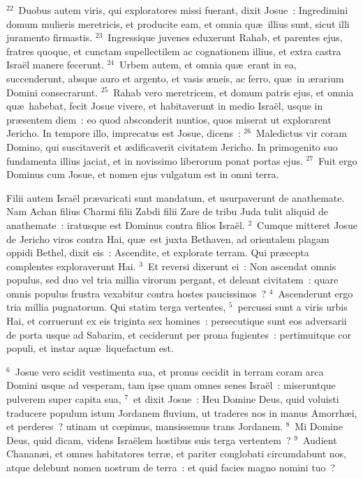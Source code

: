 ${}^{22}$~Duobus autem viris, qui exploratores missi fuerant, dixit Josue~: Ingredimini domum mulieris meretricis, et producite eam, et omnia qu\ae\ illius sunt, sicut illi juramento firmastis.
${}^{23}$~Ingressique juvenes eduxerunt Rahab, et parentes ejus, fratres quoque, et cunctam supellectilem ac cognationem illius, et extra castra Isra\"el manere fecerunt.
${}^{24}$~Urbem autem, et omnia qu\ae\ erant in ea, succenderunt, absque auro et argento, et vasis \ae neis, ac ferro, qu\ae\ in \ae rarium Domini consecrarunt.
${}^{25}$~Rahab vero meretricem, et domum patris ejus, et omnia qu\ae\ habebat, fecit Josue vivere, et habitaverunt in medio Isra\"el, usque in pr\ae sentem diem~: eo quod absconderit nuntios, quos miserat ut explorarent Jericho. In tempore illo, imprecatus est Josue, dicens~:
${}^{26}$~Maledictus vir coram Domino, qui suscitaverit et \ae dificaverit civitatem Jericho. In primogenito suo fundamenta illius jaciat, et in novissimo liberorum ponat portas ejus.
${}^{27}$~Fuit ergo Dominus cum Josue, et nomen ejus vulgatum est in omni terra.

\lettrine[lines=3,image=true,loversize=0.05,lraise=-0.03]{F}{}ilii autem Isra\"el pr\ae varicati sunt mandatum, et usurpaverunt de anathemate. Nam Achan filius Charmi filii Zabdi filii Zare de tribu Juda tulit aliquid de anathemate~: iratusque est Dominus contra filios Isra\"el.
${}^{2}$~Cumque mitteret Josue de Jericho viros contra Hai, qu\ae\ est juxta Bethaven, ad orientalem plagam oppidi Bethel, dixit eis~: Ascendite, et explorate terram. Qui pr\ae cepta complentes exploraverunt Hai.
${}^{3}$~Et reversi dixerunt ei~: Non ascendat omnis populus, sed duo vel tria millia virorum pergant, et deleant civitatem~: quare omnis populus frustra vexabitur contra hostes paucissimos~?
${}^{4}$~Ascenderunt ergo tria millia pugnatorum. Qui statim terga vertentes,
${}^{5}$~percussi sunt a viris urbis Hai, et corruerunt ex eis triginta sex homines~: persecutique sunt eos adversarii de porta usque ad Sabarim, et ceciderunt per prona fugientes~: pertimuitque cor populi, et instar aqu\ae\ liquefactum est.


${}^{6}$~Josue vero scidit vestimenta sua, et pronus cecidit in terram coram arca Domini usque ad vesperam, tam ipse quam omnes senes Isra\"el~: miseruntque pulverem super capita sua,
${}^{7}$~et dixit Josue~: Heu Domine Deus, quid voluisti traducere populum istum Jordanem fluvium, ut traderes nos in manus Amorrh\ae i, et perderes~? utinam ut cœpimus, mansissemus trans Jordanem.
${}^{8}$~Mi Domine Deus, quid dicam, videns Isra\"elem hostibus suis terga vertentem~?
${}^{9}$~Audient Chanan\ae i, et omnes habitatores terr\ae , et pariter conglobati circumdabunt nos, atque delebunt nomen nostrum de terra~: et quid facies magno nomini tuo~?


